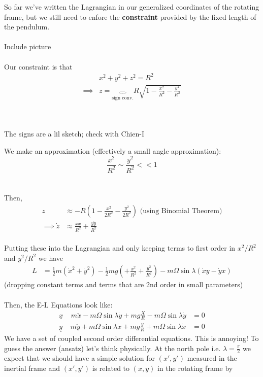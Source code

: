 \documentclass[11pt]{article}
\begin{document}
So far we've written the Lagrangian in our generalized coordinates of the rotating frame, but we still need to enfore the \textbf{constraint} provided by the fixed length of the pendulum.
\\
\\
Include picture
\\
\\
Our constraint is that 
\begin{align*}
  &x^2 + y^2 + z^2 = R^2 \\
  \implies& z = \underbrace{-}_{\text{sign conv.}} R \sqrt{1 - \frac{x^2}{R^2} - \frac{y^2}{R^2}}
\end{align*}
\\
\\
\begin{note}
  {The signs are a lil sketch; check with Chien-I}\\
\end{note}
We make an approximation (effectively a small angle approximation):
\[ \frac{x^2}{R^2} \sim \frac{y^2}{R^2} << 1 \] 
\\
\\
Then,
\begin{align*}
  z &\approx -R \left(1 - \frac{x^2}{2R^2} - \frac{y^2}{2R^2 }\right) \text{  (using Binomial Theorem)} \\
  \implies \dot{z} &\approx \frac{x \dot{x}}{R^2} + \frac{y\dot{y}}{R^2}
\end{align*}
\\
Putting these into the Lagrangian and only keeping terms to first order in $x^2/R^2$ and $y^2/R^2$ we have 
\\
\begin{align*}
  L &= \frac{1}{2}m\left(\dot{x}^2 + \dot{y}^2\right) - \frac{1}{2}mg \left(+\frac{x^2}{R^2}+\frac{y^2}{R^2}\right) - m\Omega\sin\lambda \left(\dot{x}y - \dot{y}x\right)
\end{align*}
(dropping constant terms and terms that are 2nd order in small parameters)
\\
\\
Then, the E-L Equations look like:
\begin{align*}
  \underline{x}\;\;\;\;m\ddot{x} -m\Omega\sin\lambda\dot{y} + mg \frac{X}{R} - m\Omega\sin\lambda\dot{y} &= 0 \\
  \underline{y}\;\;\;\;m\ddot{y} + m\Omega\sin\lambda \dot{x} + mg \frac{y}{R} + m\Omega\sin\lambda \dot{x} &= 0
\end{align*}
We have a set of coupled second order differential equations. This is annoying! To guess the answer (ansatz) let's think physically. At the north pole i.e. $\lambda = \frac{\pi}{2}$ we expect that we should have a simple solution for $(x', y')$ measured in the inertial frame and $(x', y')$ is related to $(x,y)$ in the rotating frame by 
\end{document}

